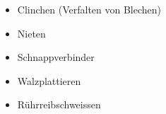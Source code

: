 \begin{itemize}
    \item Clinchen (Verfalten von Blechen)
    \item Nieten
    \item Schnappverbinder
    \item Walzplattieren
    \item Rührreibschweissen
\end{itemize}